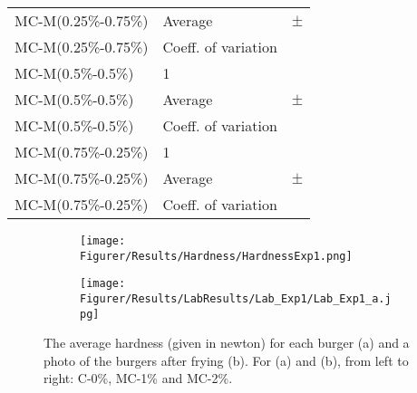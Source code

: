\begin{table}[H]
\begin{tabular}{ll|l}
MC-M(0.25\%-0.75\%)       & Average   &  $\pm$  \\
MC-M(0.25\%-0.75\%)       & Coeff. of variation &  \\
\hline
MC-M(0.5\%-0.5\%)       &  1       &  \\
MC-M(0.5\%-0.5\%)       & Average   &  $\pm$  \\
MC-M(0.5\%-0.5\%)       & Coeff. of variation &  \\
\hline
MC-M(0.75\%-0.25\%)       &  1       &  \\
MC-M(0.75\%-0.25\%)       & Average   &  $\pm$  \\
MC-M(0.75\%-0.25\%)       & Coeff. of variation &  \\
\bottomrule
    \end{tabular}%
    \label{tab:RawData:ShearForce:Exp6}
\end{table}


\begin{figure}[H]
\begin{subfigure}{.48\textwidth}
  \centering
  \texttt{[image: Figurer/Results/Hardness/HardnessExp1.png]}
  \caption{}
  \label{fig:Results:Parameters:Hardness:Exp1}
\end{subfigure}
\begin{subfigure}{.48\textwidth}
  \centering
  \texttt{[image: Figurer/Results/LabResults/Lab\_Exp1/Lab\_Exp1\_a.jpg]}
  \caption{}
  \label{fig:LabResults:Exp1_burgers}
\end{subfigure}
\caption{The average hardness (given in newton) for each burger (a) and a photo of the burgers after frying (b). For (a) and (b), from left to right: C-0\%, MC-1\% and MC-2\%.}
\label{fig:fig}
\end{figure}



